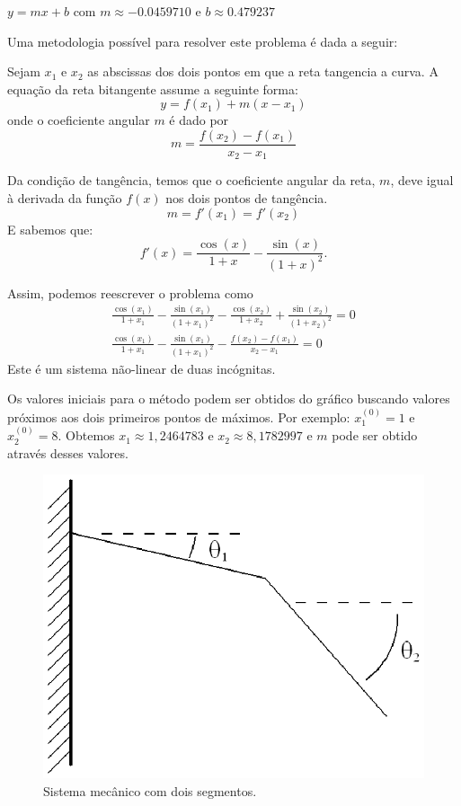  \begin{resp}
  $y=mx+b$ com $m\approx - 0.0459710 $ e $b\approx 0.479237$
 
 Uma metodologia possível para resolver este problema é dada a seguir:

Sejam $x_1$ e $x_2$ as abscissas dos dois pontos em que a reta tangencia a curva. A equação da reta bitangente assume a seguinte forma:
$$y=f(x_1) + m(x-x_1) $$
onde o coeficiente angular $m$ é dado por
$$m=\frac{f(x_2)-f(x_1)}{x_2-x_1}$$

Da condição de tangência, temos que o coeficiente angular da reta, $m$, deve igual à derivada da função $f(x)$ nos dois pontos de tangência.
$$m=f'(x_1)=f'(x_2)$$
E sabemos que:
$$f'(x)=\frac{\cos(x)}{1+x}-\frac{\sin(x)}{(1+x)^2}.$$

Assim, podemos reescrever o problema como
\begin{eqnarray*}
\frac{\cos(x_1)}{1+x_1}-\frac{\sin(x_1)}{(1+x_1)^2}-\frac{\cos(x_2)}{1+x_2}+\frac{\sin(x_2)}{(1+x_2)^2}=0\\
\frac{\cos(x_1)}{1+x_1}-\frac{\sin(x_1)}{(1+x_1)^2}-\frac{f(x_2)-f(x_1)}{x_2-x_1}=0
\end{eqnarray*}
Este é um sistema não-linear de duas incógnitas.

Os valores iniciais para o método podem ser obtidos do gráfico buscando valores próximos aos dois primeiros pontos de máximos. Por exemplo: $x_1^{(0)}=1$ e $x_2^{(0)}=8$. Obtemos $x_1\approx 1,2464783$ e $x_2\approx 8,1782997$ e $m$ pode ser obtido através desses valores.


\end{resp}

\begin{figure}
        \centering
	    \includegraphics[width=.5\textwidth]{cap_nlinsis/pics/dois_segmentos}
		\caption{Sistema mecânico com dois segmentos.}
		\label{pic:dois_segmentos}
	\end{figure}

